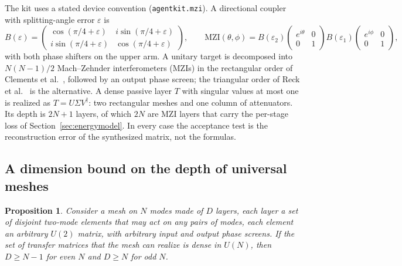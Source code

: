 \documentclass[11pt,a4paper]{article}
\newtheorem{proposition}{Proposition}
\begin{document}
The kit uses a stated device convention (\texttt{agentkit.mzi}). A directional coupler with splitting-angle error $\varepsilon$ is
\begin{equation}
B(\varepsilon)=\begin{pmatrix}\cos(\pi/4+\varepsilon) & i\sin(\pi/4+\varepsilon)\\ i\sin(\pi/4+\varepsilon) & \cos(\pi/4+\varepsilon)\end{pmatrix},
\qquad
\mathrm{MZI}(\theta,\phi)=B(\varepsilon_2)\begin{pmatrix}e^{i\theta}&0\\0&1\end{pmatrix}B(\varepsilon_1)\begin{pmatrix}e^{i\phi}&0\\0&1\end{pmatrix},
\label{eq:mzi}
\end{equation}
with both phase shifters on the upper arm. A unitary target is decomposed into $N(N-1)/2$ Mach--Zehnder interferometers (MZIs) in the rectangular order of Clements et al.\ \cite{Clements2016}, followed by an output phase screen; the triangular order of Reck et al.\ \cite{Reck1994} is the alternative. A dense passive layer $T$ with singular values at most one is realized as $T=U\Sigma V^\dagger$: two rectangular meshes and one column of attenuators. Its depth is $2N+1$ layers, of which $2N$ are MZI layers that carry the per-stage loss of Section~\ref{sec:energymodel}. In every case the acceptance test is the reconstruction error of the synthesized matrix, not the formulas.

\subsection{A dimension bound on the depth of universal meshes}
\label{sec:depth}

\begin{proposition}
\label{prop:depth}
Consider a mesh on $N$ modes made of $D$ layers, each layer a set of disjoint two-mode elements that may act on \emph{any} pairs of modes, each element an arbitrary $U(2)$ matrix, with arbitrary input and output phase screens. If the set of transfer matrices that the mesh can realize is dense in $U(N)$, then $D\ge N-1$ for even $N$ and $D\ge N$ for odd $N$.
\end{proposition}
\end{document}
